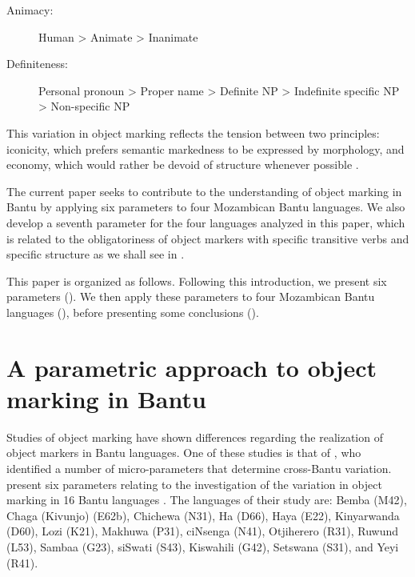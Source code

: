 \documentclass[output=paper]{langscibook}
\begin{document}
\begin{description}
\item [Animacy:] Human > Animate > Inanimate
\item [Definiteness:] Personal pronoun > Proper name > Definite NP > Indefinite specific NP > Non-specific NP
\end{description}

This variation in object marking reflects the tension between two principles: iconicity, which prefers semantic markedness to be expressed by morphology, and economy, which would rather be devoid of structure whenever possible \citep{Aissen2002}.

The current paper seeks to contribute to the understanding of object marking in Bantu by applying  six parameters to four Mozambican Bantu languages. We also develop a seventh parameter for the four languages analyzed in this paper, which is related to the obligatoriness of object markers with specific transitive verbs and specific structure as we shall see in . 

This paper is organized as follows. Following this introduction, we present  six parameters (). We then apply these parameters to four Mozambican Bantu languages (), before presenting some conclusions (). 

\section{A parametric approach to object marking in Bantu}
\label{sec:ngunga:2}

Studies of object marking have shown differences regarding the realization of object markers in Bantu languages. One of these studies is that of \citet{MartenKula2012}, who identified a number of micro-parameters that determine cross-Bantu variation. \citet{MartenKula2012} present six parameters relating to the investigation of the variation in object marking in 16 Bantu languages . The languages of their study are: Bemba (M42), Chaga (Kivunjo) (E62b), Chichewa (N31), Ha (D66), Haya (E22), Kinyarwanda (D60), Lozi (K21), Makhuwa (P31), ciNsenga (N41), Otjiherero (R31), Ruwund (L53), Sambaa (G23), siSwati (S43), Kiswahili (G42), Setswana (S31), and Yeyi (R41).
\end{document}
